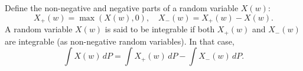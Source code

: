 Define the non-negative and negative parts of a random variable $X(w)$:
$$X_+(w) = \max(X(w), 0), \quad X_-(w) = X_+(w) - X(w).$$
A random variable $X(w)$ is said to be integrable if both $X_+(w)$ and $X_-(w)$ are integrable (as non-negative random variables). In that case,
$$\int X(w) \, dP = \int X_+(w) \, dP - \int X_-(w) \, dP.$$
